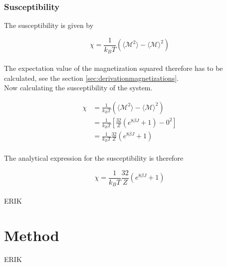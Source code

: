 \documentclass{article}
\begin{document}
\subsubsection{Susceptibility} \label{sec:susceptibility}

The susceptibility is given by

\begin{equation}    \label{eq:susceptibility}
    \chi = \frac{1}{k_B T} \left( \langle \mathcal{M}^2 \rangle - \langle \mathcal{M} \rangle ^2 \right)
\end{equation} \\

The expectation value of the magnetization squared therefore has to be calculated, see the section \ref{sec:derivationmagnetizations}. \\

Now calculating the susceptibility of the system.

\begin{align*}
    \chi &= \frac{1}{k_B T} \left( \langle \mathcal{M}^2 \rangle - \langle \mathcal{M} \rangle ^2 \right) \\
    &= \frac{1}{k_B T} \left[ \frac{32}{Z} \left( e^{8 \beta J} + 1 \right) - 0^2 \right] \\
    &= \frac{1}{k_B T} \frac{32}{Z} \left( e^{8 \beta J} + 1 \right) \\
\end{align*}

The analytical expression for the susceptibility is therefore

\begin{equation}    \label{eq:finalsusceptibility}
    \chi = \frac{1}{k_B T} \frac{32}{Z} \left( e^{8 \beta J} + 1 \right)
\end{equation} \\


ERIK



\vspace{1cm}

\section{Method} \label{sec:Method}

ERIK

\vspace{1cm}
\end{document}
